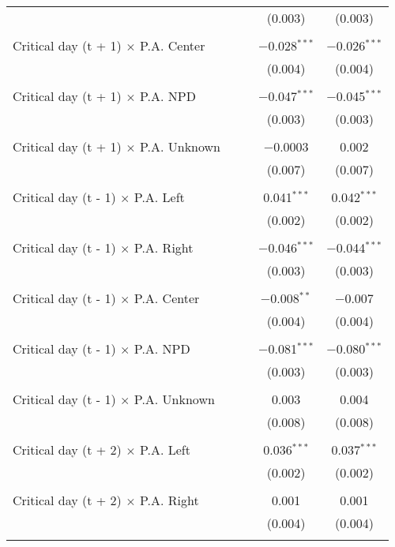 \documentclass[
]{article}
\begin{document}
\begin{table}[!htbp]
{\begin{tabular}{@{\extracolsep{5pt}}lcccc}
  &  &  & (0.003) & (0.003) \\ 
  & & & & \\ 
 Critical day (t + 1) $\times$ P.A. Center &  &  & $-$0.028$^{***}$ & $-$0.026$^{***}$ \\ 
  &  &  & (0.004) & (0.004) \\ 
  & & & & \\ 
 Critical day (t + 1) $\times$ P.A. NPD &  &  & $-$0.047$^{***}$ & $-$0.045$^{***}$ \\ 
  &  &  & (0.003) & (0.003) \\ 
  & & & & \\ 
 Critical day (t + 1) $\times$ P.A. Unknown &  &  & $-$0.0003 & 0.002 \\ 
  &  &  & (0.007) & (0.007) \\ 
  & & & & \\ 
 Critical day (t - 1) $\times$ P.A. Left &  &  & 0.041$^{***}$ & 0.042$^{***}$ \\ 
  &  &  & (0.002) & (0.002) \\ 
  & & & & \\ 
 Critical day (t - 1) $\times$ P.A. Right &  &  & $-$0.046$^{***}$ & $-$0.044$^{***}$ \\ 
  &  &  & (0.003) & (0.003) \\ 
  & & & & \\ 
 Critical day (t - 1) $\times$ P.A. Center &  &  & $-$0.008$^{**}$ & $-$0.007 \\ 
  &  &  & (0.004) & (0.004) \\ 
  & & & & \\ 
 Critical day (t - 1) $\times$ P.A. NPD &  &  & $-$0.081$^{***}$ & $-$0.080$^{***}$ \\ 
  &  &  & (0.003) & (0.003) \\ 
  & & & & \\ 
 Critical day (t - 1) $\times$ P.A. Unknown &  &  & 0.003 & 0.004 \\ 
  &  &  & (0.008) & (0.008) \\ 
  & & & & \\ 
 Critical day (t + 2) $\times$ P.A. Left &  &  & 0.036$^{***}$ & 0.037$^{***}$ \\ 
  &  &  & (0.002) & (0.002) \\ 
  & & & & \\ 
 Critical day (t + 2) $\times$ P.A. Right &  &  & 0.001 & 0.001 \\ 
  &  &  & (0.004) & (0.004) \\ 
  & & & & \\ 

\end{tabular}}
\end{table}
\end{document}
